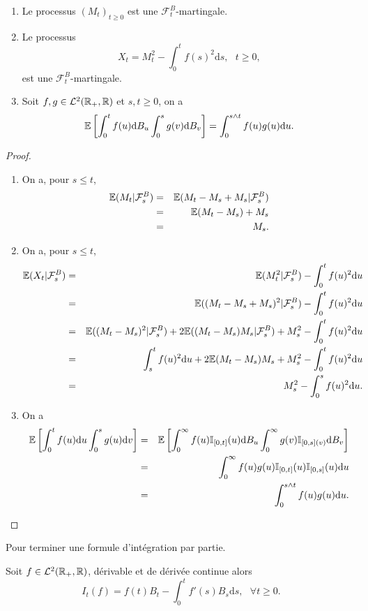 \begin{prop}
\begin{enumerate}
\item Le processus $(M_t)_{t\geq 0}$ est une $\mathcal{F}_t^B$-martingale.
\item Le processus
$$
X_t = M_t^2 - \int_0^tf(s)^2\text{d}s,\text{ }t\geq 0,
$$
est une $\mathcal{F}_t^B$-martingale.
\item Soit $f,g\in \mathcal{L}^2(\mathbb{R}_+,\mathbb{R})$ et $s,t\geq 0$, on a 
$$
\mathbb{E}\left[\int_0^tf(u)\text{d}B_u\int_0^sg(v)\text{d}B_v\right] = \int_0^{s\land t}f(u)g(u)\text{d}u. 
$$
\end{enumerate}
\end{prop}
\begin{proof}
\begin{enumerate}
	\item On a, pour $s\leq t$,
	\begin{eqnarray*}
	\mathbb{E}(M_t|\mathcal{F}_s^B)&=&\mathbb{E}(M_t-M_s +M_s|\mathcal{F}_s^B)\\
	&=&\mathbb{E}(M_t-M_s) +M_s\\
	&=& M_s.
	\end{eqnarray*}
	\item On a, pour $s\leq t$,
	\begin{eqnarray*}
	\mathbb{E}(X_t|\mathcal{F}_s^B)&=&\mathbb{E}(M_t^2|\mathcal{F}_s^B) - \int_0^tf(u)^2\text{d}u\\
	&=&\mathbb{E}((M_t-M_s+M_s)^2|\mathcal{F}_s^B) - \int_0^tf(u)^2\text{d}u\\
	&=&\mathbb{E}((M_t-M_s)^2|\mathcal{F}_s^B)+2\mathbb{E}((M_t-M_s)M_s|\mathcal{F}_s^B) + M_s^2-\int_0^tf(u)^2\text{d}u\\
	&=&\int_s^t f(u)^2\text{d}u + 2\mathbb{E}(M_t-M_s)M_s + M_s^2 - \int_0^tf(u)^2\text{d}u\\
	&=&M_s^2 - \int_0^sf(u)^2\text{d}u.
	\end{eqnarray*}
	\item On a 
	\begin{eqnarray*}
	\mathbb{E}\left[\int_0^tf(u)\text{d}u\int_0^sg(u)\text{d}v\right]&=&\mathbb{E}\left[\int_0^\infty f(u)\mathbb{I}_{[0,t]}(u)\text{d}B_u\int_0^\infty g(v)\mathbb{I}_{[0,s](v)}\text{d}B_v\right]\\
	&=&\int_0^\infty f(u)g(u)\mathbb{I}_{[0,t]}(u)\mathbb{I}_{[0,s]}(u)\text{d}u\\
	&=&\int_0^{s\land t} f(u)g(u)\text{d}u.\\
	\end{eqnarray*}
\end{enumerate}
\end{proof}
Pour terminer une formule d'intégration par partie.
\begin{theo}
Soit $f\in \mathcal{L}^2(\mathbb{R}_+,\mathbb{R})$, dérivable et de dérivée continue alors 
$$
I_t(f) = f(t)B_t - \int_0^tf'(s)B_s\text{d}s,\text{ }\forall t\geq 0.
$$
\end{theo}
